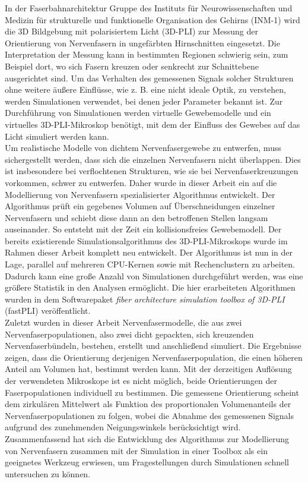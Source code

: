 % 
% 
% 
{
\let\cleardoublepage\clearpage
{}
}
% 
In der Faserbahnarchitektur Gruppe des Instituts für Neurowissenschaften und Medizin für strukturelle und funktionelle Organisation des Gehirns (INM-1) wird die 3D Bildgebung mit polarisiertem Licht (3D-PLI) zur Messung der Orientierung von Nervenfasern in ungefärbten Hirnschnitten eingesetzt.
Die Interpretation der Messung kann in bestimmten Regionen schwierig sein, zum Beispiel dort, wo sich Fasern kreuzen oder senkrecht zur Schnittebene ausgerichtet sind.
Um das Verhalten des gemessenen Signals solcher Strukturen ohne weitere äußere Einflüsse, wie z. B. eine nicht ideale Optik, zu verstehen, werden Simulationen verwendet, bei denen jeder Parameter bekannt ist.
Zur Durchführung von Simulationen werden virtuelle Gewebemodelle und ein virtuelles 3D-PLI-Mikroskop benötigt, mit dem der Einfluss des Gewebes auf das Licht simuliert werden kann.
\\
% 
Um realistische Modelle von dichtem Nervenfasergewebe zu entwerfen, muss sichergestellt werden, dass sich die einzelnen Nervenfasern nicht überlappen.
Dies ist insbesondere bei verflochtenen Strukturen, wie sie bei Nervenfaserkreuzungen vorkommen, schwer zu entwerfen.
Daher wurde in dieser Arbeit ein auf die Modellierung von Nervenfasern spezialisierter Algorithmus entwickelt.
Der Algorithmus prüft ein gegebenes Volumen auf Überschneidungen einzelner Nervenfasern und schiebt diese dann an den betroffenen Stellen langsam auseinander.
So entsteht mit der Zeit ein kollisionsfreies Gewebemodell.
Der bereits existierende Simulationsalgorithmus des 3D-PLI-Mikroskops wurde im Rahmen dieser Arbeit komplett neu entwickelt.
Der Algorithmus ist nun in der Lage, parallel auf mehreren CPU-Kernen sowie mit Rechenclustern zu arbeiten.
Dadurch kann eine große Anzahl von Simulationen durchgeführt werden, was eine größere Statistik in den Analysen ermöglicht.
Die hier erarbeiteten Algorithmen wurden in dem Softwarepaket \textit{fiber architecture simulation toolbox of 3D-PLI} (fastPLI) veröffentlicht.
\\
% 
Zuletzt wurden in dieser Arbeit Nervenfasermodelle, die aus zwei Nervenfaserpopulationen, also zwei dicht gepackten, sich kreuzenden Nervenfaserbündeln, bestehen, erstellt und anschließend simuliert.
Die Ergebnisse zeigen, dass die Orientierung derjenigen Nervenfaserpopulation, die einen höheren Anteil am Volumen hat, bestimmt werden kann.
Mit der derzeitigen Auflösung der verwendeten Mikroskope ist es nicht möglich, beide Orientierungen der Faserpopulationen individuell zu bestimmen.
Die gemessene Orientierung scheint dem zirkulären Mittelwert als Funktion des proportionalen Volumenanteils der Nervenfaserpopulationen zu folgen, wobei die Abnahme des gemessenen Signals aufgrund des zunehmenden Neigungswinkels berücksichtigt wird.
Zusammenfassend hat sich die Entwicklung des Algorithmus zur Modellierung von Nervenfasern zusammen mit der Simulation in einer Toolbox als ein geeignetes Werkzeug erwiesen, um Fragestellungen durch Simulationen schnell untersuchen zu können.